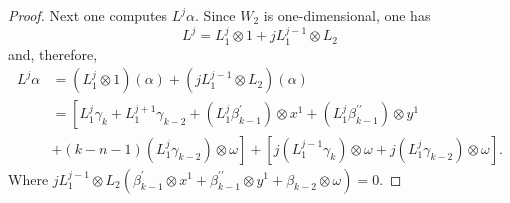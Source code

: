 \begin{proof}
Next one computes $L^j \alpha$. Since $W_2$ is one-dimensional, one has 
\[L^j=L_1^j \otimes 1+j L_1^{j-1} \otimes L_2\]
 and, therefore,
$$
\begin{aligned}
L^j \alpha 
&= \left(L_1^j \otimes 1\right) (\alpha) +\left( j L_1^{j-1} \otimes L_2\right) (\alpha)\\
&= \left[ L_1^j \gamma_k+L_1^{j+1} \gamma_{k-2} +\left(L_1^j \beta_{k-1}^{\prime}\right) \otimes x^1+\left(L_1^j \beta_{k-1}^{\prime \prime}\right) \otimes y^1\right.\\
&\left.+(k-n-1)\left(L_1^j \gamma_{k-2}\right) \otimes \omega\right]+\left[j\left(L_1^{j-1} \gamma_k\right) \otimes \omega+j\left(L_1^j \gamma_{k-2}\right) \otimes \omega\right].
\end{aligned}
$$
Where $jL_1^{j-1}\otimes L_2 (\beta_{k-1}^{\prime} \otimes x^1+\beta_{k-1}^{\prime \prime} \otimes y^1+\beta_{k-2} \otimes \omega)=0$.


\end{proof}
